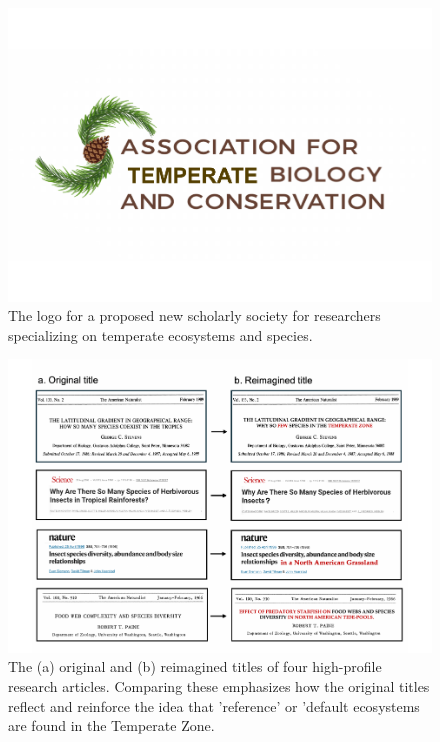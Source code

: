 \documentclass[
  12pt,
  man, donotrepeattitle,floatsintext]{apa6}
\begin{document}
\newpage

\begin{figure}[H]

{\centering \includegraphics[width=1\linewidth,height=0.8\textheight,]{Bruna_plenary_MS_files/figure-latex/fig-temp-1} 

}

\caption{The logo for a proposed new scholarly society for researchers specializing on temperate ecosystems and species.}\label{fig:fig-temp}
\end{figure}

\newpage

\begin{figure}[H]

{\centering \includegraphics[width=1\linewidth,height=1\textheight,]{Bruna_plenary_MS_files/figure-latex/fig-pubs-1} 

}

\caption{The (a) original and (b) reimagined titles of four high-profile research articles. Comparing these emphasizes how the original titles reflect and reinforce the idea that 'reference' or 'default ecosystems are found in the Temperate Zone.}\label{fig:fig-pubs}
\end{figure}
\newpage
\end{document}
